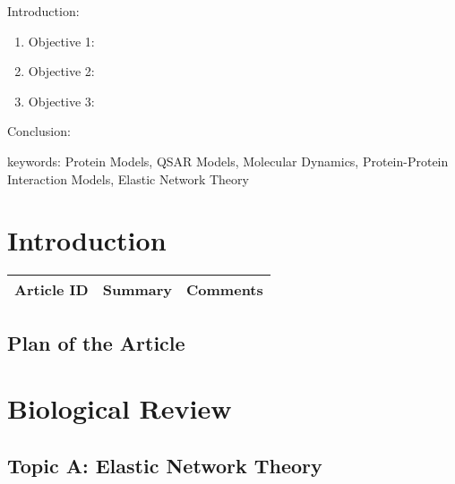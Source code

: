


\twocolumn
\scriptsize
\begin{frontmatter}
		\title{}
		\author{}
		\address{The Mathematical Learning Space}
\end{frontmatter}	

Introduction:
\begin{enumerate}
\item Objective 1:
\item Objective 2:
\item Objective 3:
\end{enumerate}
Conclusion:

keywords: Protein Models, QSAR Models, Molecular Dynamics, Protein-Protein Interaction Models, Elastic Network Theory

\section{Introduction}

\begin{table}[H]\centering
	\begin{tabular}{p{1cm}p{4cm}p{3cm}}
		Article ID & Summary & Comments\\
		\hline
		\hline
	\end{tabular}
\end{table}

\subsection{Plan of the Article}

\begin{enumerate}
\end{enumerate}


\section{Biological Review}

\subsection{Topic A: Elastic Network Theory}

